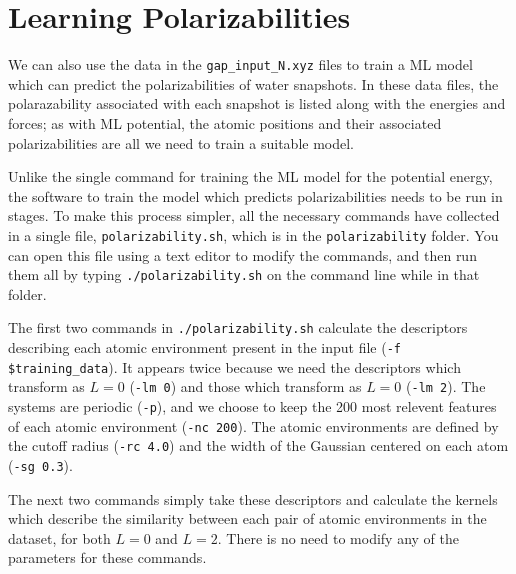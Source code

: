 \documentclass{article}
\begin{document}
\section{Learning Polarizabilities}

We can also use the data in the \verb|gap_input_N.xyz| files to train a ML model which can predict the polarizabilities of water snapshots. In these data files, the polarazability associated with each snapshot is listed along with the energies and forces; as with ML potential, the atomic positions and their associated polarizabilities are all we need to train a suitable model.

Unlike the single command for training the ML model for the potential energy, the software to train the model which predicts polarizabilities needs to be run in stages. To make this process simpler, all the necessary commands have collected in a single file, \verb|polarizability.sh|, which is in the \verb|polarizability| folder. You can open this file using a text editor to modify the commands, and then run them all by typing \verb|./polarizability.sh| on the command line while in that folder.


The first two commands in \verb|./polarizability.sh| calculate the descriptors describing each atomic environment present in the input file (\verb|-f $training_data|). It appears twice because we need the descriptors which transform as $L=0$ (\verb|-lm 0|) and those which transform as $L=0$ (\verb|-lm 2|). The systems are periodic (\verb|-p|), and we choose to keep the 200 most relevent features of each atomic environment (\verb|-nc 200|). The atomic environments are defined by the cutoff radius (\verb|-rc 4.0|) and the width of the Gaussian centered on each atom (\verb|-sg 0.3|).

The next two commands simply take these descriptors and calculate the kernels which describe the similarity between each pair of atomic environments in the dataset, for both $L=0$ and $L=2$. There is no need to modify any of the parameters for these commands.
\end{document}
